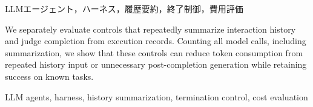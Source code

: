 \begin{abstract}
LLMエージェントの履歴を反復要約する制御と，実行記録から完了を判断する制御を個別に評価した．要約処理も含む全呼出しを計測し，既知課題で成功を保ちながら，履歴の再入力や完了後の不要な生成によるトークン消費を抑えられることを示した．
\end{abstract}
\begin{keyword}
LLMエージェント，ハーネス，履歴要約，終了制御，費用評価
\end{keyword}
\begin{eabstract}
We separately evaluate controls that repeatedly summarize interaction history and judge completion from execution records. Counting all model calls, including summarization, we show that these controls can reduce token consumption from repeated history input or unnecessary post-completion generation while retaining success on known tasks.
\end{eabstract}
\begin{ekeyword}
LLM agents, harness, history summarization, termination control, cost evaluation
\end{ekeyword}
